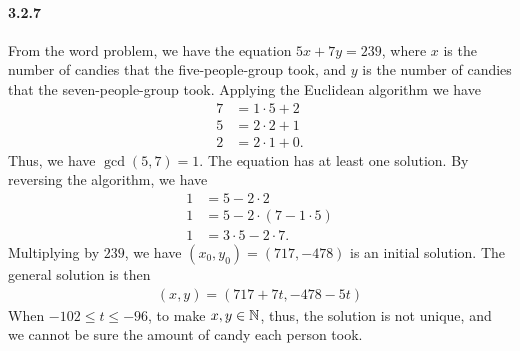 \documentclass[8pt,twocolumn]{article}
\begin{document}
\paragraph{3.2.7}
From the word problem, we have the equation $5x+7y=239$, where $x$ is the
number of candies that the five-people-group took, and $y$ is the number of
candies that the seven-people-group took. Applying the Euclidean algorithm we
have
\begin{align*}
  7 &= 1\cdot 5 + 2 \\
  5 &= 2\cdot 2 + 1 \\
  2 &= 2\cdot 1 + 0.
\end{align*}
Thus, we have $\gcd(5,7)=1$. The equation has at least one solution. By
reversing the algorithm, we have
\begin{align*}
  1 &= 5 - 2\cdot2 \\
  1 &= 5 - 2\cdot(7 - 1\cdot 5) \\
  1 &= 3\cdot5 - 2\cdot7.
\end{align*}
Multiplying by $239$, we have $(x_0,y_0) = (717,-478)$ is an initial solution.
The general solution is then
\begin{align*}
  (x,y) = (717+7t,-478-5t)
\end{align*}
When $-102\le t\le-96$, to make $x,y\in\mathbb{N}$, thus, the solution is not unique,
and we cannot be sure the amount of candy each person took.
\end{document}
